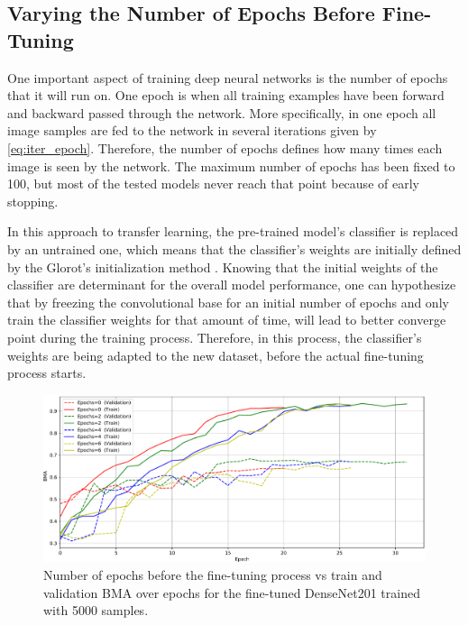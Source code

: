     \subsection{Varying the Number of Epochs Before Fine-Tuning}
    One important aspect of training deep neural networks is the number of epochs that it will run on. One epoch is when all training examples have been forward and backward passed through the network. More specifically, in one epoch all image samples are fed to the network in several iterations given by \autoref{eq:iter_epoch}. Therefore, the number of epochs defines how many times each image is seen by the network. The maximum number of epochs has been fixed to 100, but most of the tested models never reach that point because of early stopping. \par
    
    In this approach to transfer learning, the pre-trained model's classifier is replaced by an untrained one, which means that the classifier's weights are initially defined by the Glorot's initialization method \cite{Glorot2010}. Knowing that the initial weights of the classifier are determinant for the overall model performance, one can hypothesize that by freezing the convolutional base for an initial number of epochs and only train the classifier weights for that amount of time, will lead to better converge point during the training process. Therefore, in this process, the classifier's weights are being adapted to the new dataset, before the actual fine-tuning process starts. \par
    
     \par
    \begin{figure}[ht]
        \centering
        \includegraphics[width=\textwidth]{figs/densenet201_wiepochs_over_epochs.pdf}
        \caption{Number of epochs before the fine-tuning process vs train and validation \ac{BMA} over epochs for the fine-tuned DenseNet201 trained with 5000 samples.}
        \label{fig:wiepochs_comp}
    \end{figure}
    
